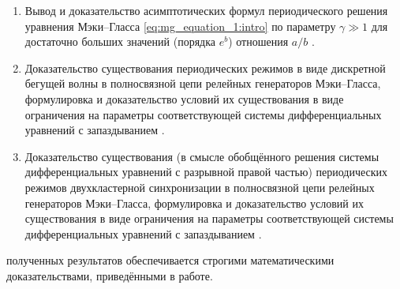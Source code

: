 {}
\begin{enumerate}[beginpenalty=10000] %
  \item Вывод и доказательство асимптотических формул периодического решения уравнения Мэки--Гласса \eqref{eq:mg_equation_1:intro} по параметру $\gamma \gg 1$ для достаточно больших значений (порядка $e^b$) отношения $a / b$ \cite{wosbib1}.
  \item Доказательство существования периодических режимов в виде дискретной бегущей волны в полносвязной цепи релейных генераторов Мэки--Гласса, формулировка и доказательство условий их существования в виде ограничения на параметры соответствующей системы дифференциальных уравнений с запаздыванием \cite{wosbib2}.
  \item Доказательство существования (в смысле обобщённого решения системы дифференциальных уравнений с разрывной правой частью) периодических режимов двухкластерной синхронизации в полносвязной цепи релейных генераторов Мэки--Гласса, формулировка и доказательство условий их существования в виде ограничения на параметры соответствующей системы дифференциальных уравнений с запаздыванием \cite{scbib1}.
\end{enumerate}


{\reliability} полученных результатов обеспечивается строгими математическими доказательствами, приведёнными в работе. %

\nocite{scbib1, wosbib1, wosbib2}

